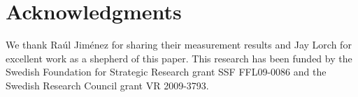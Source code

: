 \section*{Acknowledgments}

We thank Raúl Jiménez\etal{} %
\cite{JimenezOK11} for sharing their measurement results and Jay Lorch for
excellent work as a shepherd of this paper. This research has been funded by
the Swedish Foundation for Strategic Research grant SSF FFL09-0086 and the
Swedish Research Council grant VR 2009-3793.




% 
% 

% 